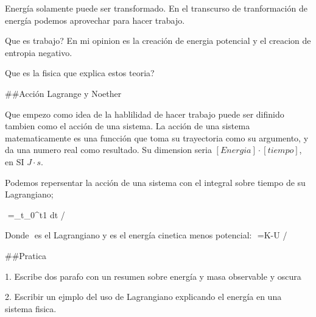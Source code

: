 Energía solamente puede ser transformado. En el transcurso de tranformación de energía podemos aprovechar para hacer trabajo.

Que es trabajo? En mi opinion es la creación de energia potencial y el creacion de entropia negativo.

Que es la fisica que explica estos teoria?

##Acción Lagrange y Noether

Que empezo como idea de la hablilidad de hacer trabajo puede ser difinido tambien como el acción de una sistema. La acción de una sistema matematicamente es una funcción que toma su trayectoria como su argumento, y da una numero real como resultado. Su dimension seria $[Energia] \cdot [tiempo]$, en SI $J \cdot s$.
	
Podemos repersentar la acción de una sistema con el integral sobre tiempo de su Lagrangiano;
	
{$$}
	=\int_{t_0}^{t1}  dt
{/$$}

Donde {$$} es el Lagrangiano y es el energía cinetica menos potencial:
{$$}
	=K-U
{/$$}

##Pratica

1. Escribe dos parafo con un resumen sobre energía y masa observable y oscura

2. Escribir un ejmplo del uso de Lagrangiano explicando el energía en una sistema fisica. 
 
